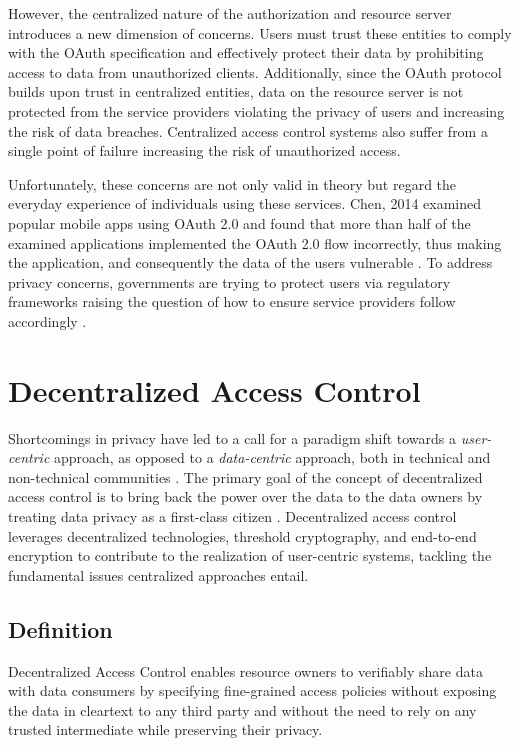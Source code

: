 \documentclass[conference]{IEEEtran}
\begin{document}
However, the centralized nature of the authorization and resource server introduces a new dimension of concerns.
Users must trust these entities to comply with the OAuth specification and effectively protect their data by prohibiting access to data from unauthorized clients.
Additionally, since the OAuth protocol builds upon trust in centralized entities, data on the resource server is not protected from the service providers violating the privacy of users and increasing the risk of data breaches.
Centralized access control systems also suffer from a single point of failure increasing the risk of unauthorized access.

Unfortunately, these concerns are not only valid in theory but regard the everyday experience of individuals using these services.
Chen, 2014 examined popular mobile apps using OAuth 2.0 and found that more than half of the examined applications implemented the OAuth 2.0 flow incorrectly, thus making the application, and consequently the data of the users vulnerable \cite{chen_oauth_2014}.
To address privacy concerns, governments are trying to protect users via regulatory frameworks raising the question of how to ensure service providers follow accordingly \cite{noauthor_general_nodate}.

\section{Decentralized Access Control}
Shortcomings in privacy have led to a call for a paradigm shift towards a \textit{user-centric} approach, as opposed to a \textit{data-centric} approach, both in technical and non-technical communities \cite{ernstberger_sok_2023, shafagh_droplet_2020}.
The primary goal of the concept of decentralized access control is to bring back the power over the data to the data owners by treating data privacy as a first-class citizen \cite{ernstberger_sok_2023}.
Decentralized access control leverages decentralized technologies, threshold cryptography, and end-to-end encryption to contribute to the realization of user-centric systems, tackling the fundamental issues centralized approaches entail.

\subsection{Definition}
Decentralized Access Control enables resource owners to verifiably share data with data consumers by specifying fine-grained access policies without exposing the data in cleartext to any third party and without the need to rely on any trusted intermediate while preserving their privacy.
\end{document}
